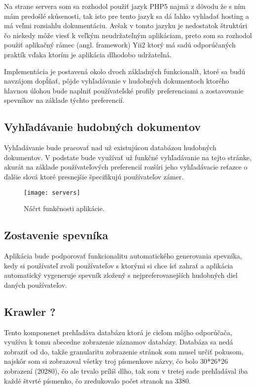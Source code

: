 Na strane servera som sa rozhodol použiť jazyk PHP5 najmä z dôvodu že s ním mám predošlé 
skúsenosti, tak isto pre tento jazyk sa dá ľahko vyhladať hosting a má veľmi rozsiahlu 
dokumentáciu. Avšak v tomto jazyku je nedostatok štruktúri čo niekedy môže viesť k veľkým
neudržateľným aplikáciam, preto som sa rozhodol použiť aplikačný rámec (angl. framework) 
Yii2 ktorý má sadú odporúčaných praktík vďaka ktorím je aplikácia dlhodobo udržateľná.


Implementácia je postavená okolo dvoch základných funkcionalít,
ktoré sa budú navzájom dopĺňať,
pôjde vyhľadávanie v hudobných dokumentoch
ktorého hlavnou úlohou bude naplniť používateľské profily
preferenciami a zostavovanie spevníkov na základe týchto preferencií. 

\subsection{Vyhľadávanie hudobných dokumentov}

Vyhľadávanie bude pracovať nad už existujúcou databázou hudobných dokumentov.
V podstate bude využívať už funkčné vyhľadávanie na tejto stránke,
akurát na základe používateľových preferencií
rozšíri jeho vyhľadávacie reťazce o ďalšie slová ktoré presnejšie špecifikujú používateľov zámer.

\begin{figure}\begin{center}\texttt{[image: servers]}
\caption{Náčrt funkčnosti aplikácie.}\label{Náčrt funkčnosti aplikácie}
\end{center}\end{figure}

\subsection{Zostavenie spevníka}

Aplikácia bude podporovať funkcionalitu automatického generovania spevníka,
kedy si používateľ zvoli používateľov s ktorými si chce ísť zahrať
a aplikácia automatický vygeneruje spevník
zložený s nejpreferovanejších hudobných diel daných používateľov.

\subsection{Krawler ?}

Tento komponenet prehľadáva databázu ktorá je cieľom môjho odporúčača,
využíva k tomu abecedne zobrazenie záznamov databázy.
Databáza sa nedá zobraziť od do,
takže granularitu zobrazenie stránok som musel určiť pokusom,
najskôr som si zobrazoval všetky troj písmenkove názvy,
čo bolo 30*26*26 zobrazení (20280), čo ale trvalo príliš dlho,
tak som v tretej sade prehľadával iba každé štvrté písmenko,
čo zredukovalo počet stranok na 3380.

